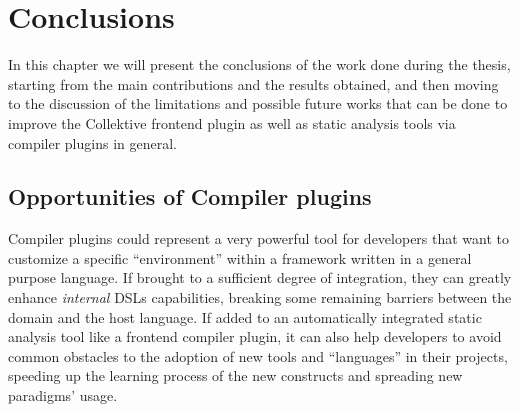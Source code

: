 \documentclass[12pt,a4paper,openright,twoside]{book}
\begin{document}
\chapter{Conclusions}
\label{chap:conclusion}

In this chapter we will present the conclusions of the work done during the
thesis, starting from the main contributions and the results obtained, and then
moving to the discussion of the limitations and possible future works that can
be done to improve the Collektive frontend plugin as well as static analysis 
tools via compiler plugins in general.

\section{Opportunities of Compiler plugins}

Compiler plugins could represent a very powerful tool for developers that want
to customize a specific ``environment'' within a framework written in a general
purpose language. If brought to a sufficient degree of integration, they can
greatly enhance \emph{internal} \acp{DSL} capabilities, breaking some remaining
barriers between the domain and the host language. If added to an automatically
integrated static analysis tool like a frontend compiler plugin, it can also
help developers to avoid common obstacles to the adoption of new tools and
``languages'' in their projects, speeding up the learning process of the new
constructs and spreading new paradigms' usage.
\end{document}
